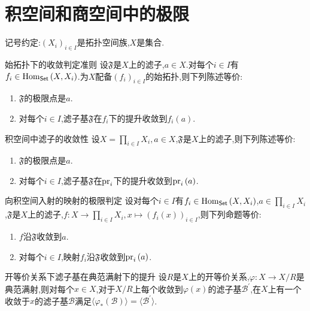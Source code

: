 \section{积空间和商空间中的极限}

记号约定:$\left(X_{i}\right)_{i\in I}$是拓扑空间族,$X$是集合.

\begin{proposition}{始拓扑下的收敛判定准则}{}
	设$\mathfrak{F}$是$X$上的滤子,$a\in X$.对每个$i\in I$有$f_{i}\in\operatorname{Hom}_{\mathsf{Set}}\left(X,X_{i}\right)$.为$X$配备$\left(f_{i}\right)_{i\in I}$的始拓扑,则下列陈述等价:
	\begin{enumerate}
		\item $\mathfrak{F}$的极限点是$a$.
		\item 对每个$i\in I$,滤子基$\mathfrak{F}$在$f_{i}$下的提升收敛到$f_{i}\left(a\right)$.
	\end{enumerate}
\end{proposition}

\begin{corollary}{积空间中滤子的收敛性}{}
	设$X=\prod\limits_{i\in I}X_{i},a\in X$,$\mathfrak{F}$是$X$上的滤子,则下列陈述等价:
	\begin{enumerate}
		\item $\mathfrak{F}$的极限点是$a$.
		\item 对每个$i\in I$,滤子基$\mathfrak{F}$在$\operatorname{pr}_{i}$下的提升收敛到$\operatorname{pr}_{i}\left(a\right)$.
	\end{enumerate}
\end{corollary}

\begin{corollary}{向积空间入射的映射的极限判定}{}
	设对每个$i\in I$有$f_{i}\in\operatorname{Hom}_{\mathsf{Set}}\left(X,X_{i}\right)$,$a\in\prod\limits_{i\in I}X_{i}$,$\mathfrak{F}$是$X$上的滤子,$f:X\to\prod\limits_{i\in I}X_{i},x\mapsto\left(f_{i}\left(x\right)\right)_{i\in I}$,则下列命题等价:
	\begin{enumerate}
		\item $f$沿$\mathfrak{F}$收敛到$a$.
		\item 对每个$i\in I$,映射$f_{i}$沿$\mathfrak{F}$收敛到$\operatorname{pr}_{i}\left(a\right)$.
	\end{enumerate}
\end{corollary}

\begin{proposition}{开等价关系下滤子基在典范满射下的提升}{}
	设$R$是$X$上的开等价关系,$\varphi:X\to X/R$是典范满射,则对每个$x\in X$,对于$X/R$上每个收敛到$\varphi\left(x\right)$的滤子基$\mathcal{B}^{\prime}$,在$X$上有一个收敛于$x$的滤子基$\mathcal{B}$满足$\langle\varphi_{\ast}\left(\mathcal{B}\right)\rangle=\langle\mathcal{B}^{\prime}\rangle$.
\end{proposition}














